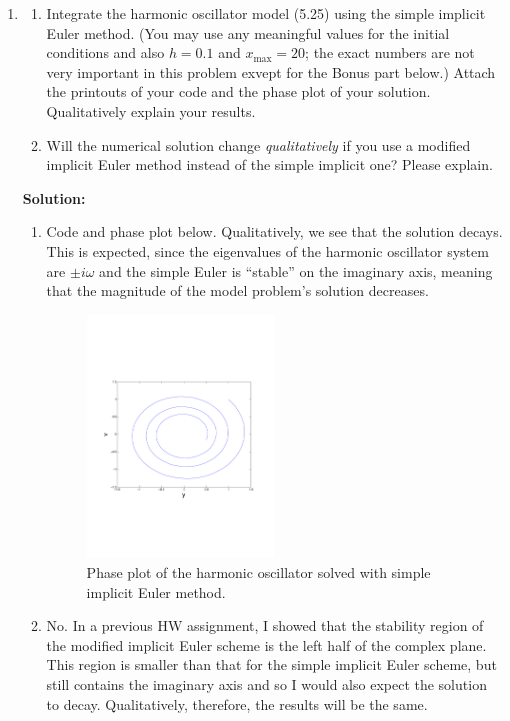 \documentclass[11pt]{article}
\begin{document}
\begin{enumerate}
\begin{enumerate}
\end{enumerate}

\item 
\begin{enumerate}
\item Integrate the harmonic oscillator model (5.25) using the simple implicit Euler method.
(You may use any meaningful values for the initial conditions and also $h = 0.1$ and $x_{\text{max}} = 20$; the exact numbers are not very important in this problem exvept for the Bonus part below.)
Attach the printouts of your code and the phase plot of your solution.
Qualitatively explain your results.

\item Will the numerical solution change {\em qualitatively} if you use a modified implicit Euler method instead of the simple implicit one?
Please explain.
\end{enumerate}

\bigskip
\textbf{Solution:} 
\begin{enumerate}
\item Code and phase plot below.
Qualitatively, we see that the solution decays.
This is expected, since the eigenvalues of the harmonic oscillator system are $\pm i \omega$ and the simple Euler is ``stable'' on the imaginary axis, meaning that the magnitude of the model problem's solution decreases.

\begin{figure}[h!]
  \centering
    \includegraphics[width=0.5\textwidth]{andy_exam01_prb04_01.pdf}
  \caption{Phase plot of the harmonic oscillator solved with simple implicit Euler method.}
\end{figure}




\item No. In a previous HW assignment, I showed that the stability region of the modified implicit Euler scheme is the left half of the complex plane.
This region is smaller than that for the simple implicit Euler scheme, but still contains the imaginary axis and so I would also expect the solution to decay.
Qualitatively, therefore, the results will be the same.
\end{enumerate}

\end{enumerate}
\end{document}
